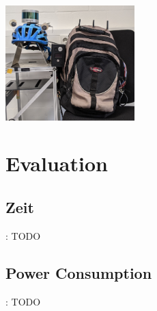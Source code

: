 \documentclass{beamer}
\begin{document}
\begin{frame}{\secname}
\begin{textblock*}{5cm}
\includegraphics[width=5cm]{images/Rucksack01.jpg}
\end{textblock*}
\end{frame}

\section{Evaluation}
\subsection{Zeit}
\begin{frame}{\secname: \subsecname}
TODO
\end{frame}

\subsection{Power Consumption}
\begin{frame}{\secname: \subsecname}
TODO
\end{frame}
\end{document}
